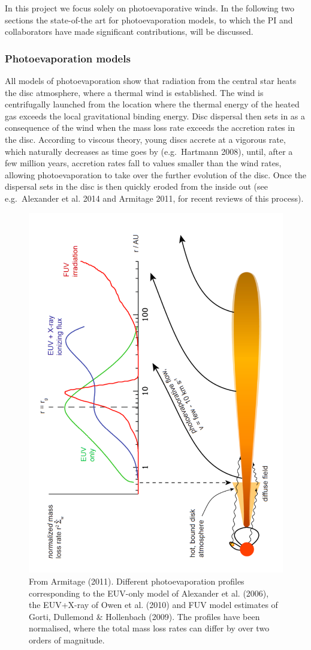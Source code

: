 \documentclass[10pt,fleqn,twoside]{article}
\begin{document}
In this project we focus solely on photoevaporative winds.
In the following two sections the state-of-the art for photoevaporation
models, to which the PI and collaborators have made significant contributions, will be discussed.
 
\subsubsection{Photoevaporation models} 

All models of photoevaporation show that radiation from the central
star heats the disc atmosphere, where a thermal  wind is established.
The wind is centrifugally launched from the location where the thermal
energy of the heated gas exceeds the local gravitational binding
energy. 
Disc dispersal then sets in as a consequence of the wind when the mass
loss rate exceeds the accretion rates in the disc. According to
viscous theory, young discs accrete
at a vigorous rate, which naturally decreases as time goes by
(e.g.\ Hartmann 2008), until,
after a few million years, accretion rates fall to values smaller than
the wind rates, allowing photoevaporation to take over the further
evolution of the disc. Once the dispersal sets in the disc is then
quickly eroded from the inside out (see e.g.\ Alexander et al. 2014 and
Armitage 2011, for recent reviews of this process).  


\begin{figure}
  \includegraphics[width=0.75\linewidth, angle = 270]{profiles.pdf}
  \caption{From Armitage (2011). Different photoevaporation profiles
    corresponding to the EUV-only model of Alexander et al. (2006),
    the EUV+X-ray of Owen et al. (2010) and FUV model estimates of
    Gorti, Dullemond \& Hollenbach (2009). The profiles have been
    normalised, where the total mass loss rates can differ by over two
    orders of magnitude. }
  \label{fig:profiles}
\end{figure}
\end{document}
